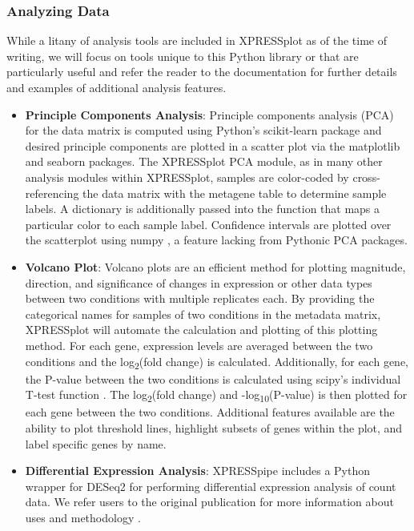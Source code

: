 \documentclass[11pt, a4paper, oneside]{article}
\begin{document}
\subsubsection{Analyzing Data}

While a litany of analysis tools are included in XPRESSplot as of the time of writing, we will focus on tools unique to this Python library or that are particularly useful and refer the reader to the documentation for further details and examples of additional analysis features.

\begin{itemize}
  \item \textbf{Principle Components Analysis}: Principle components analysis (PCA) for the data matrix is computed using Python's scikit-learn package \cite{scikit_learn} and desired principle components are plotted in a scatter plot via the matplotlib \cite{matplotlib} and seaborn \cite{seaborn} packages. The XPRESSplot PCA module, as in many other analysis modules within XPRESSplot, samples are color-coded by cross-referencing the data matrix with the metagene table to determine sample labels. A dictionary is additionally passed into the function that maps a particular color to each sample label. Confidence intervals are plotted over the scatterplot using numpy \cite{numpy1, numpy2}, a feature lacking from Pythonic PCA packages.

  \item \textbf{Volcano Plot}: Volcano plots are an efficient method for plotting magnitude, direction, and significance of changes in expression or other data types between two conditions with multiple replicates each. By providing the categorical names for samples of two conditions in the metadata matrix, XPRESSplot will automate the calculation and plotting of this plotting method. For each gene, expression levels are averaged between the two conditions and the log\textsubscript{2}(fold change) is calculated. Additionally, for each gene, the P-value between the two conditions is calculated using scipy's individual T-test function \cite{scipy}. The log\textsubscript{2}(fold change) and -log\textsubscript{10}(P-value) is then plotted for each gene between the two conditions. Additional features available are the ability to plot threshold lines, highlight subsets of genes within the plot, and label specific genes by name.

  \item \textbf{Differential Expression Analysis}: XPRESSpipe includes a Python wrapper for DESeq2 for performing differential expression analysis of count data. We refer users to the original publication for more information about uses and methodology \cite{deseq2}.

\end{itemize}
\end{document}
